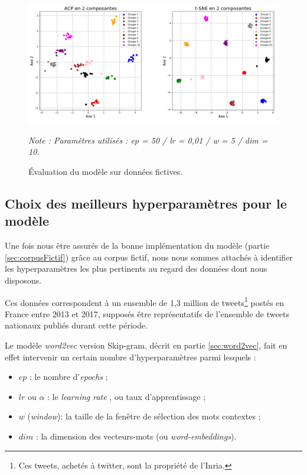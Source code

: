 \documentclass[11pt,french,french]{article}
\let\rmarkdownfootnote\footnote%
\def\footnote{\protect\rmarkdownfootnote}
\begin{document}
\begin{figure}
\begin{center}
\includegraphics[width=1\textwidth]{img/figures2.png}
\captionsetup{margin=0cm,format=hang,justification=justified}
\caption{Évaluation du modèle sur données fictives.}\label{fig:figure_evaluation}
\end{center}
\vspace{-0.3cm}
\footnotesize
\emph{Note : Paramètres utilisés : ep = 50 / lr = 0,01 / w = 5 / dim = 10.}
\end{figure}

\subsection{Choix des meilleurs hyperparamètres pour le
modèle}\label{sec:hyperparametres}

Une fois nous être assurés de la bonne implémentation du modèle (partie
\ref{sec:corpusFictif}) grâce au corpus fictif, nous nous sommes
attachés à identifier les hyperparamètres les plus pertinents au regard
des données dont nous disposons.

Ces données correspondent à un ensemble de 1,3 million de
tweets\footnote{Ces tweets, achetés à twitter, sont la propriété de
  l'Inria.} postés en France entre 2013 et 2017, supposés être
représentatifs de l'ensemble de tweets nationaux publiés durant cette
période.

Le modèle \emph{word2vec} version Skip-gram, décrit en partie
\ref{sec:word2vec}, fait en effet intervenir un certain nombre
d'hyperparamètres parmi lesquels :

\begin{itemize}
\item $ep$ : le nombre d'\og \emph{epochs} \fg{} ;
\item $lr$ ou $\alpha$ : le \og \emph{learning rate} \fg, ou taux d'apprentissage ;
\item $w$ (\emph{window}): la taille de la fenêtre de sélection des mots contextes ;
\item $dim$ : la dimension des vecteurs-mots (ou \emph{word-embeddings}).
\end{itemize}
\end{document}
